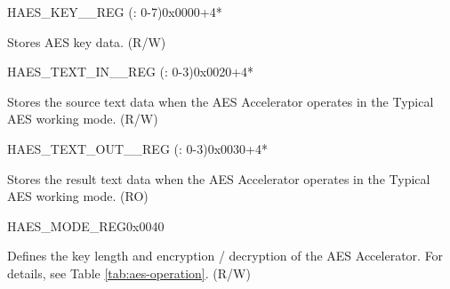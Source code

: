 \begin{register}{H}{AES\_KEY\_\_REG (: 0-7)}{0x0000+4*}\label{regdesc:AESKEYnREG}
%
\regnewline%
\begin{regdesc}\begin{reglist}
\item [AES\_KEY\_\regindex{n}\_REG (\regindex{n}: 0-7)] Stores AES key data. (R/W)
\end{reglist}\end{regdesc}
\end{register}


\begin{register}{H}{AES\_TEXT\_IN\_\_REG (: 0-3)}{0x0020+4*}\label{regdesc:AESTEXTINnREG}
%
\regnewline%
\begin{regdesc}\begin{reglist}
\item [AES\_TEXT\_IN\_\regindex{m}\_REG (\regindex{m}: 0-3)] Stores the source text data when the AES Accelerator operates in the Typical AES working mode. (R/W)
\end{reglist}\end{regdesc}
\end{register}


\begin{register}{H}{AES\_TEXT\_OUT\_\_REG (: 0-3)}{0x0030+4*}\label{regdesc:AESTEXTOUTnREG}
%
\regnewline%
\begin{regdesc}\begin{reglist}
\item [AES\_TEXT\_OUT\_\regindex{m}\_REG (\regindex{m}: 0-3)] Stores the result text data when the AES Accelerator operates in the Typical AES working mode. (RO)
\end{reglist}\end{regdesc}
\end{register}


\begin{register}{H}{AES\_MODE\_REG}{0x0040}\label{regdesc:AESMODEREG}
%
%
\regnewline%
\begin{regdesc}\begin{reglist}
\item [AES\_MODE] Defines the key length and encryption / decryption of the AES Accelerator. For details, see Table \ref{tab:aes-operation}. (R/W)
\end{reglist}\end{regdesc}
\end{register}

